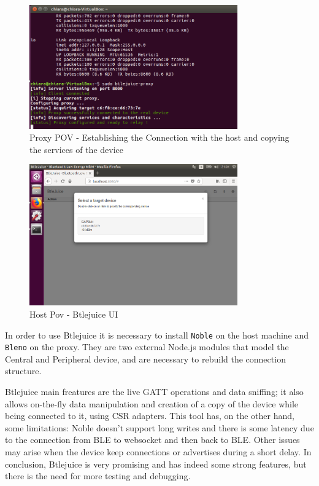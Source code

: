 \begin{figure}
	\centering
	\includegraphics[width=0.8\textwidth]{proxy1.png}
	\caption{Proxy POV - Establishing the Connection with the host and copying the services of the device}
	\label{fig:btlejuice-proxy1}
\end{figure}

\begin{figure}
	\centering
	\includegraphics[width=0.8\textwidth]{host2.png}
	\caption{Host Pov - Btlejuice UI}
	\label{fig:btlejuice-host2}
\end{figure}

In order to use Btlejuice it is necessary to install \texttt{Noble} on the host machine and \texttt{Bleno} on the proxy. They are two external Node.js modules that model the Central and Peripheral device, and are necessary to rebuild the connection structure.

Btlejuice main freatures are the live GATT operations and data sniffing; it also allows on-the-fly data manipulation and creation of a copy of the device while being connected to it, using CSR adapters. This tool has, on the other hand, some limitations: Noble doesn't support long writes and there is some latency due to the connection from BLE to websocket and then back to BLE. Other issues may arise when the device keep connections or advertises during a short delay. In conclusion, Btlejuice is very promising and has indeed some strong features, but there is the need for more testing and debugging.

